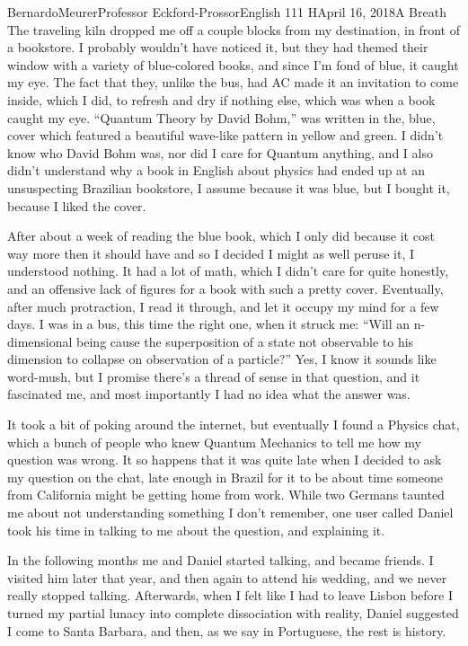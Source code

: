 \documentclass[12pt,letterpaper]{article}
\begin{document}
\begin{mla}{Bernardo}{Meurer}{Professor Eckford-Prossor}{English 111 H}{April 16, 2018}{A Breath}
	The traveling kiln dropped me off a couple blocks from my destination, in front of a bookstore. I probably wouldn't have noticed it, but they had themed their window with a variety of blue-colored books, and since I'm fond of blue, it caught my eye. The fact that they, unlike the bus, had AC made it an invitation to come inside, which I did, to refresh and dry if nothing else, which was when a book caught my eye. ``Quantum Theory by David Bohm,'' was written in the, blue, cover which featured a beautiful wave-like pattern in yellow and green. I didn't know who David Bohm was, nor did I care for Quantum anything, and I also didn't understand why a book in English about physics had ended up at an unsuspecting Brazilian bookstore, I assume because it was blue, but I bought it, because I liked the cover.

	After about a week of reading the blue book, which I only did because it cost way more then it should have and so I decided I might as well peruse it, I understood nothing. It had a lot of math, which I didn't care for quite honestly, and an offensive lack of figures for a book with such a pretty cover. Eventually, after much protraction, I read it through, and let it occupy my mind for a few days. I was in a bus, this time the right one, when it struck me: ``Will an n-dimensional being cause the superposition of a state not observable to his dimension to collapse on observation of a particle?'' Yes, I know it sounds like word-mush, but I promise there's a thread of sense in that question, and it fascinated me, and most importantly I had no idea what the answer was.

	It took a bit of poking around the internet, but eventually I found a Physics chat, which a bunch of people who knew Quantum Mechanics to tell me how my question was wrong. It so happens that it was quite late when I decided to ask my question on the chat, late enough in Brazil for it to be about time someone from California might be getting home from work. While two Germans taunted me about not understanding something I don't remember, one user called Daniel took his time in talking to me about the question, and explaining it.

	In the following months me and Daniel started talking, and became friends. I visited him later that year, and then again to attend his wedding, and we never really stopped talking. Afterwards, when I felt like I had to leave Lisbon before I turned my partial lunacy into complete dissociation with reality, Daniel suggested I come to Santa Barbara, and then, as we say in Portuguese, the rest is history.


\end{mla}
\end{document}
